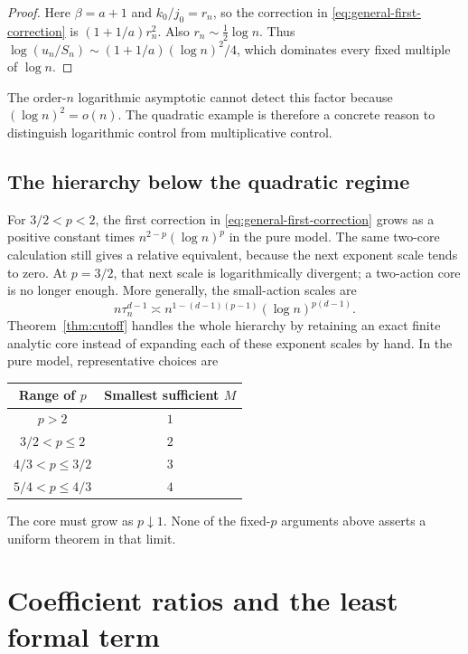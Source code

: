 \documentclass[11pt,a4paper]{article}
\numberwithin{equation}{section}
\theoremstyle{definition}
\theoremstyle{remark}
\begin{document}
\begin{proof}
Here $\beta=a+1$ and $k_0/j_0=r_n$, so the correction in
\eqref{eq:general-first-correction} is $(1+1/a)r_n^2$.
Also $r_n\sim\tfrac12\log n$. Thus
$\log(u_n/S_n)\sim(1+1/a)(\log n)^2/4$, which dominates every
fixed multiple of $\log n$.
\end{proof}

The order-$n$ logarithmic asymptotic cannot detect this factor because
$(\log n)^2=o(n)$. The quadratic example is therefore a concrete reason
to distinguish logarithmic control from multiplicative control.

\subsection{The hierarchy below the quadratic regime}

For $3/2<p<2$, the first correction in
\eqref{eq:general-first-correction} grows as a positive constant times
$n^{2-p}(\log n)^p$ in the pure model. The same two-core calculation still
gives a relative equivalent, because the next exponent scale tends to zero.
At $p=3/2$, that next scale is logarithmically divergent; a two-action core
is no longer enough. More generally, the small-action scales are
\begin{equation}
 n\tau_n^{d-1}\asymp
 n^{1-(d-1)(p-1)}(\log n)^{p(d-1)}.
 \label{eq:hierarchy}
\end{equation}
Theorem~\ref{thm:cutoff} handles the whole hierarchy by retaining an exact
finite analytic core instead of expanding each of these exponent scales by
hand. In the pure model, representative choices are
\begin{center}
\begin{tabular}{cc}
\toprule
Range of $p$ & Smallest sufficient $M$\\
\midrule
$p>2$ & $1$\\
$3/2<p\le2$ & $2$\\
$4/3<p\le3/2$ & $3$\\
$5/4<p\le4/3$ & $4$\\
\bottomrule
\end{tabular}
\end{center}
The core must grow as $p\downarrow1$. None of the fixed-$p$ arguments
above asserts a uniform theorem in that limit.

\section{Coefficient ratios and the least formal term}
\label{sec:least-term}
\end{document}
